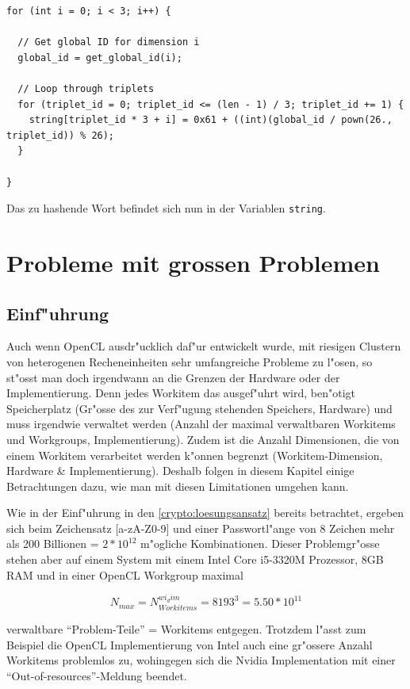 \begin{refsection}
\begin{small}
\begin{verbatim}
for (int i = 0; i < 3; i++) {

  // Get global ID for dimension i
  global_id = get_global_id(i);

  // Loop through triplets
  for (triplet_id = 0; triplet_id <= (len - 1) / 3; triplet_id += 1) {
    string[triplet_id * 3 + i] = 0x61 + ((int)(global_id / pown(26., triplet_id)) % 26);
  }

}
\end{verbatim}
\end{small}

\noindent Das zu hashende Wort befindet sich nun in der Variablen \texttt{string}.


\section{Probleme mit grossen Problemen}
\label{crypto:grosse_probleme}

\subsection{Einf"uhrung}

Auch wenn OpenCL ausdr"ucklich daf"ur entwickelt wurde, mit riesigen Clustern
von heterogenen Recheneinheiten sehr umfangreiche Probleme zu l"osen, so st"osst
man doch irgendwann an die Grenzen der Hardware oder der Implementierung.  Denn
jedes Workitem das ausgef"uhrt wird, ben"otigt Speicherplatz (Gr"osse des zur
Verf"ugung stehenden Speichers, Hardware) und muss irgendwie verwaltet werden
(Anzahl der maximal verwaltbaren Workitems und Workgroups, Implementierung).
Zudem ist die Anzahl Dimensionen, die von einem Workitem verarbeitet werden k"onnen
begrenzt (Workitem-Dimension, Hardware \& Implementierung). Deshalb folgen in
diesem Kapitel einige Betrachtungen dazu, wie man mit diesen Limitationen
umgehen kann.

Wie in der Einf"uhrung in den \ref{crypto:loesungsansatz} bereits betrachtet, 
ergeben sich beim Zeichensatz [a-zA-Z0-9] und einer Passwortl"ange von 8 Zeichen 
mehr als 200 Billionen = $2 * 10^{12}$ m"ogliche Kombinationen. Dieser Problemgr"osse 
stehen aber auf einem System mit einem Intel Core i5-3320M Prozessor, 8GB RAM und 
in einer OpenCL Workgroup maximal

\[
 N_{max} = N_{Workitems}^{wi_dim} = 8193^{3} = 5.50 * 10^{11}
\]

verwaltbare ``Problem-Teile'' = Workitems entgegen. Trotzdem l"asst zum Beispiel 
die OpenCL Implementierung von Intel auch eine gr"ossere Anzahl Workitems problemlos zu, 
wohingegen sich die Nvidia Implementation mit einer ``Out-of-resources''-Meldung 
beendet.


\end{refsection}
